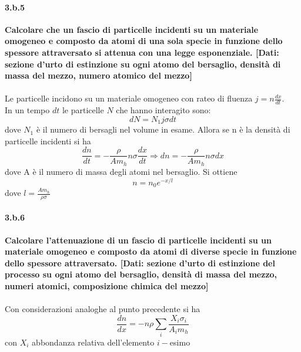 \documentclass[twoside]{article}
\begin{document}
\paragraph{3.b.5}\textbf{Calcolare che un fascio di particelle incidenti su un materiale omogeneo e composto da atomi di una sola specie in funzione dello spessore attraversato si attenua con una legge esponenziale. [Dati: sezione d'urto di estinzione su ogni atomo del bersaglio, densità di massa del mezzo, numero atomico del mezzo]}\\
\\
Le particelle incidono su un materiale omogeneo con rateo di fluenza $j=n\frac{dx}{dt}$.\\
In un tempo $dt$ le particelle $N$ che hanno interagito sono:
\begin{equation}
    dN=N_1j\sigma dt
\end{equation}
dove $N_1$ è il numero di bersagli nel volume in esame. Allora se n è la densità di particelle incidenti si ha
\begin{equation}
    \frac{dn}{dt}=-\frac{\rho}{Am_h}n\sigma \frac{dx}{dt} \Longrightarrow dn=-\frac{\rho}{Am_h}n\sigma dx
\end{equation}
dove A è il numero di massa degli atomi nel bersaglio. Si ottiene
\begin{equation}
    n=n_0e^{-x/l}
\end{equation}
dove $l=\frac{Am_h}{\rho\sigma}$


\paragraph{3.b.6}\textbf{Calcolare l'attenuazione di un fascio di particelle incidenti su un materiale omogeneo e composto da atomi di diverse specie in funzione dello spessore attraversato. [Dati: sezione d'urto di estinzione del processo su ogni atomo del bersaglio, densità di massa del mezzo, numeri atomici, composizione chimica del mezzo]}\\
\\
Con considerazioni analoghe al punto precedente si ha
\begin{equation}
    \frac{dn}{dx}=-n\rho\sum_i\frac{X_i\sigma_i}{A_im_h}
\end{equation}
con $X_i$ abbondanza relativa dell'elemento $i-$esimo
\end{document}
